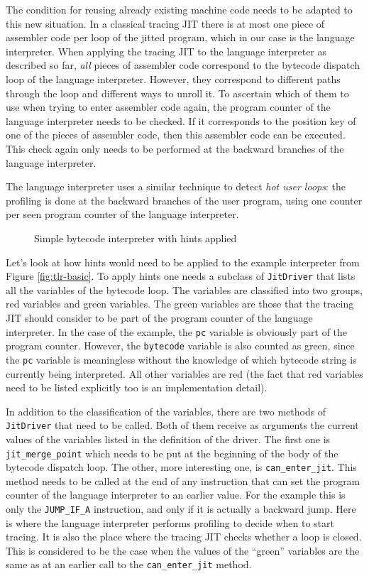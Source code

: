 \documentclass{sig-alternate}
\begin{document}
The condition for reusing already existing machine code needs to be adapted to
this new situation. In a classical tracing JIT there is at most one piece of
assembler code per loop of the jitted program, which in our case is the language
interpreter. When applying the tracing JIT to the language interpreter as
described so far, \emph{all} pieces of assembler code correspond to the bytecode
dispatch loop of the language interpreter. However, they correspond to different
paths through the loop and different ways to unroll it. To ascertain which of them to use
when trying to enter assembler code again, the program counter of the language
interpreter needs to be checked. If it corresponds to the position key of one of
the pieces of assembler code, then this assembler code can be executed. This
check again only needs to be performed at the backward branches of the language
interpreter.

The language interpreter uses a similar technique to detect \emph{hot user
loops}: the profiling is done at the backward branches of the user program,
using one counter per seen program counter of the language interpreter.

\begin{figure}

\caption{Simple bytecode interpreter with hints applied}
\label{fig:tlr-full}
\end{figure}

Let's look at how hints would need to be applied to the example interpreter
from Figure \ref{fig:tlr-basic}. To apply hints one needs a
subclass of \texttt{JitDriver} that lists all the variables of the bytecode
loop. The variables are classified into two groups, red variables and green
variables. The green variables are those that the tracing JIT should consider to
be part of the program counter of the language interpreter. In the case of the
example, the \texttt{pc} variable is obviously part of the program counter.
However, the \texttt{bytecode} variable is also counted as green, since the
\texttt{pc} variable is meaningless without the knowledge of which bytecode
string is currently being interpreted. All other variables are red (the fact
that red variables need to be listed explicitly too is an implementation
detail).

In addition to the classification of the variables, there are two methods of
\texttt{JitDriver} that need to be called. Both of them receive as arguments the
current values of the variables listed in the definition of the driver. The
first one is \texttt{jit\_merge\_point} which needs to be put at the beginning
of the body of the bytecode dispatch loop. The other, more interesting one, is
\texttt{can\_enter\_jit}. This method needs to be called at the end of any
instruction that can set the program counter of the language interpreter to an
earlier value. For the example this is only the \texttt{JUMP\_IF\_A}
instruction, and only if it is actually a backward jump. Here is
where the language interpreter performs profiling to decide
when to start tracing. It is also the place where the tracing JIT checks
whether a loop is closed. This is considered to be the case when the values of
the ``green'' variables are the same as at an earlier call to the
\texttt{can\_enter\_jit} method.
\end{document}
